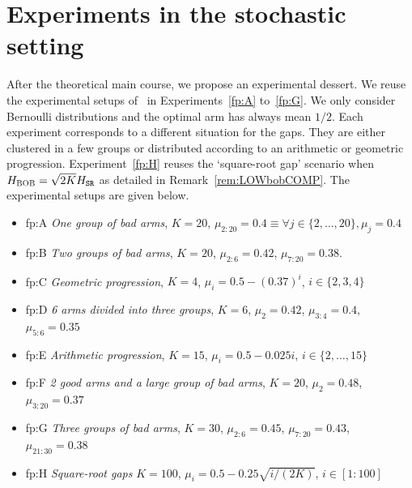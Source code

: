 %


\section{Experiments in the stochastic setting} 
\label{app:Exp}
%
After the theoretical main course, we propose an experimental dessert.
We  reuse the experimental setups of~\cite{Audibert10BA} in Experiments~\ref{fp:A} to~\ref{fp:G}. We only consider Bernoulli distributions and the optimal arm  has always mean
$1/2$. Each experiment corresponds to a different situation for the gaps. They are either clustered in a few groups
or distributed according to an arithmetic or geometric progression. Experiment~\ref{fp:H} reuses the `square-root gap' scenario when $H_{{\normalfont \textsc{{BOB}}}} = \sqrt{2K}H_{{\normalfont \texttt{SR}}}$ as detailed in Remark~\ref{rem:LOWbobCOMP}. The experimental setups are given below. %
\begin{itemize}[leftmargin=*]
	\item[] 
	\begin{fp}{fp:A}{}
\textit{One group of bad arms},
	$K= 20$, $\mu_{2:20}= 0.4 \equiv \forall j\in \{2,\ldots,20\}, \mu_j= 0.4$
\end{fp}
		\item[]  \begin{fp}{fp:B}{} \textit{Two groups of bad arms},
	$K	= 20$, $\mu_{2:6} =  0.42$, $\mu_{7:20} =  0.38$.\end{fp}
		\item[] \begin{fp}{fp:C}{} \textit{Geometric progression},
	$K	= 4$, $\mu_{i} = 0.5 -(0.37)^i$, $i\in \{2,	3,4\}$ \end{fp}
		\item[] 	\begin{fp}{fp:D}{}
	\textit{6
	arms divided into three groups},	
	$K	= 6$, $\mu_2 = 0.42$, 	$\mu_{3:4}= 0.4$, $\mu_{5:6}= 0.35$\end{fp}
		\item[] 	\begin{fp}{fp:E}{} \textit{Arithmetic progression},
	$K 	= 15$, $\mu_i= 0.5 -0.025i$, $i\in \{	2,\ldots,15\}$ \end{fp}
		\item[] 	\begin{fp}{fp:F}{} \textit{2 good arms and a large group of bad arms}, $K= 20$, $\mu_2 = 0.48$, $\mu_{3:20}= 0.37$\end{fp}
		\item[]  	\begin{fp}{fp:G}{} \textit{Three groups of bad arms},
	$K = 30$, $\mu_{2:6}	= 0.45$, $\mu_{7:20} = 0.43$,
	$\mu_{21:30}= 0.38$	 \end{fp}
			\item[]  \begin{fp}{fp:H}{} \textit{Square-root gaps}
			$K	= 100$, $\mu_{i} = 0.5 - 0.25\sqrt{i/(2K)}$, $i\in [1:100]$ \end{fp}
\end{itemize}
